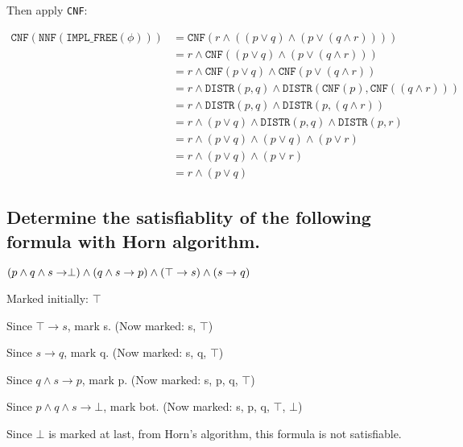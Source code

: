 \documentclass{ctexart}
\def\d{\vee}
\def\c{\wedge}
\def\NNF{\texttt{NNF}}
\def\IMPLFREE{\texttt{IMPL\_FREE}}
\def\CNF{\texttt{CNF}}
\def\DISTR{\texttt{DISTR}}
\begin{document}
\newpage

Then apply \CNF:

$$
\begin{aligned}
    \CNF(\NNF(\IMPLFREE(\phi))) &= \CNF(r \c ((p \d q) \c (p \d (q \c r)))) \\
    &= r \c \CNF((p \d q) \c (p \d (q \c r)))\\
    &= r \c \CNF(p \d q) \c \CNF(p \d (q \c r))\\
    &= r \c \DISTR(p, q) \c \DISTR(\CNF(p), \CNF((q \c r))) \\
    &= r \c \DISTR(p, q) \c \DISTR(p, (q \c r)) \\
    &= r \c (p \d q) \c \DISTR(p, q) \c \DISTR(p, r)\\
    &= r \c (p \d q) \c (p \d q) \c (p \d r)\\
    &= r \c (p \d q) \c (p \d r) \\
    & = r \c (p \d q)
\end{aligned}
$$
\subsection{Determine the satisfiablity of the following formula with Horn algorithm.}

$
(p \wedge q \wedge s \rightarrow \perp) \wedge(q \wedge s \rightarrow p) \wedge(\top \rightarrow s) \wedge(s \rightarrow q)\\
$

Marked initially: $\top$

Since $\top \to s$, mark s. (Now marked: s, $\top$)

Since $s \to q$, mark q. (Now marked: s, q, $\top$)

Since $q \c s \to p$, mark p. (Now marked: s, p, q, $\top$)

Since $p \c q \c s \to \bot$, mark bot. (Now marked: s, p, q, $\top$, $\bot$)

Since $\bot$ is marked at last, from Horn's algorithm, this formula is not satisfiable.
\end{document}
